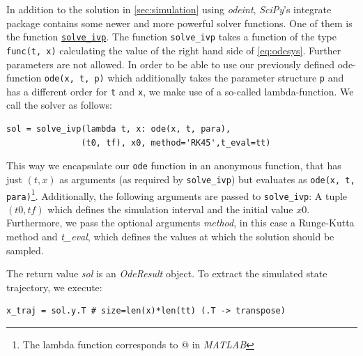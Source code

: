 \documentclass[a4paper,11pt,headings=standardclasses,parskip=half]{scrartcl}
\newcommand{\scipy}{\emph{SciPy}\xspace}
\begin{document}
In addition to the solution in \autoref{sec:simulation} using \emph{odeint}, \scipy's integrate package contains some newer and more powerful solver functions. One of them is the function \href{https://docs.scipy.org/doc/scipy/reference/generated/scipy.integrate.solve_ivp.html}{\texttt{solve\_ivp}}. The function \texttt{solve\_ivp} takes a function of the type \texttt{func(t, x)} calculating the value of the right hand side of \eqref{eq:odesys}. Further parameters are not allowed. In order to be able to use our previously defined ode-function \texttt{ode(x, t, p)} which additionally takes the parameter structure \texttt{p} and has a different order for \texttt{t}  and \texttt{x}, we make use of a so-called lambda-function. We call the solver as follows:
\begin{lstlisting}
sol = solve_ivp(lambda t, x: ode(x, t, para), 
               (t0, tf), x0, method='RK45',t_eval=tt)
\end{lstlisting}
This way we encapsulate our \texttt{ode} function in an anonymous function, that has just $(t, x)$ as arguments (as required by \texttt{solve\_ivp}) but evaluates as \texttt{ode(x, t, para)}\footnote{The lambda function corresponds to @ in \emph{MATLAB}}. Additionally, the following arguments are passed to \texttt{solve\_ivp}: A tuple $(t0, tf)$ which defines the simulation interval and the initial value $x0$. Furthermore, we pass the optional arguments \emph{method}, in this case a Runge-Kutta method and \emph{t\_eval}, which defines the values at which the solution should be sampled.

The return value \emph{sol} is an \emph{OdeResult} object. To extract the simulated state trajectory, we execute:
\begin{lstlisting}
x_traj = sol.y.T # size=len(x)*len(tt) (.T -> transpose)
\end{lstlisting}


\printglossaries
\end{document}
